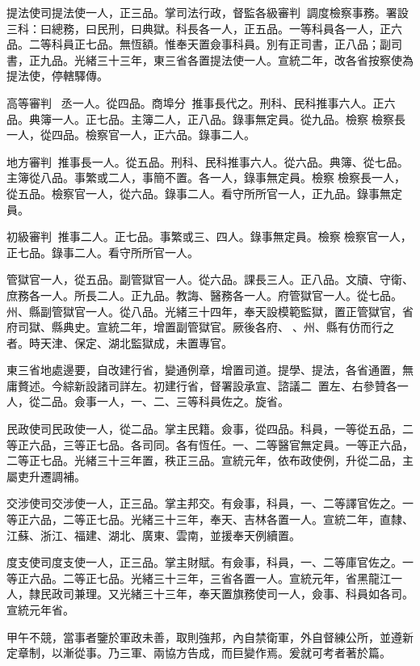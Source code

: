 \begin{pinyinscope}
提法使司提法使一人，正三品。掌司法行政，督監各級審判，調度檢察事務。署設三科：曰總務，曰民刑，曰典獄。科長各一人，正五品。一等科員各一人，正六品。二等科員正七品。無恆額。惟奉天置僉事科員。別有正司書，正八品；副司書，正九品。光緒三十三年，東三省各置提法使一人。宣統二年，改各省按察使為提法使，停轄驛傳。

高等審判，丞一人。從四品。商埠分，推事長代之。刑科、民科推事六人。正六品。典簿一人。正七品。主簿二人，正八品。錄事無定員。從九品。檢察檢察長一人，從四品。檢察官一人，正六品。錄事二人。

地方審判，推事長一人。從五品。刑科、民科推事六人。從六品。典簿、從七品。主簿從八品。事繁或二人，事簡不置。各一人，錄事無定員。檢察檢察長一人，從五品。檢察官一人，從六品。錄事二人。看守所所官一人，正九品。錄事無定員。

初級審判，推事二人。正七品。事繁或三、四人。錄事無定員。檢察檢察官一人，正七品。錄事二人。看守所所官一人。

管獄官一人，從五品。副管獄官一人。從六品。課長三人。正八品。文牘、守衛、庶務各一人。所長二人。正九品。教誨、醫務各一人。府管獄官一人。從七品。州、縣副管獄官一人。從八品。光緒三十四年，奉天設模範監獄，置正管獄官，省府司獄、縣典史。宣統二年，增置副管獄官。厥後各府、、州、縣有仿而行之者。時天津、保定、湖北監獄成，未置專官。

東三省地處邊要，自改建行省，變通例章，增置司道。提學、提法，各省通置，無庸贅述。今綜新設諸司詳左。初建行省，督署設承宣、諮議二，置左、右參贊各一人，從二品。僉事一人，一、二、三等科員佐之。旋省。

民政使司民政使一人，從二品。掌主民籍。僉事，從四品。科員，一等從五品，二等正六品，三等正七品。各司同。各有恆任。一、二等醫官無定員。一等正六品，二等正七品。光緒三十三年置，秩正三品。宣統元年，依布政使例，升從二品，主屬吏升遷調補。

交涉使司交涉使一人，正三品。掌主邦交。有僉事，科員，一、二等譯官佐之。一等正六品，二等正七品。光緒三十三年，奉天、吉林各置一人。宣統二年，直隸、江蘇、浙江、福建、湖北、廣東、雲南，並援奉天例續置。

度支使司度支使一人，正三品。掌主財賦。有僉事，科員，一、二等庫官佐之。一等正六品。二等正七品。光緒三十三年，三省各置一人。宣統元年，省黑龍江一人，隸民政司兼理。又光緒三十三年，奉天置旗務使司一人，僉事、科員如各司。宣統元年省。

甲午不競，當事者鑒於軍政未善，取則強邦，內自禁衛軍，外自督練公所，並遵新定章制，以漸從事。乃三軍、兩協方告成，而巨變作焉。爰就可考者著於篇。


\end{pinyinscope}

